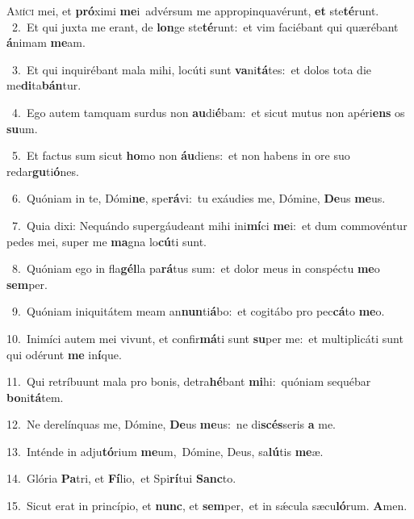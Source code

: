 \lettrine{\initial\textcolor{\initialcolor}{A}}{míci} mei, et \textbf{pró}\-ximi \textbf{me}\-i~\star advérsum me appropinquavérunt, \textbf{et} ste\-\textbf{té}\-runt.\\
{\numbfont\textcolor{\numbcolor}{~2.}}~Et qui juxta me erant, de \textbf{lon}\-ge ste\-\textbf{té}\-runt:~\star et vim faciébant qui quærébant \textbf{á}\-nimam \textbf{me}\-am.\par
{\numbfont\textcolor{\numbcolor}{~3.}}~Et qui inquirébant mala mihi, locúti sunt \textbf{va}\-ni\-\textbf{tá}\-tes:~\star et dolos tota die me\-\textbf{di}\-ta\-\textbf{bán}\-tur.\par
{\numbfont\textcolor{\numbcolor}{~4.}}~Ego autem tamquam surdus non \textbf{au}\-di\-\textbf{é}\-bam:~\star et sicut mutus non apéri\textbf{ens} os \textbf{su}\-um.\par
{\numbfont\textcolor{\numbcolor}{~5.}}~Et factus sum sicut \textbf{ho}\-mo non \textbf{áu}\-diens:~\star et non habens in ore suo redar\-\textbf{gu}\-ti\-\textbf{ó}\-nes.\par
{\numbfont\textcolor{\numbcolor}{~6.}}~Quóniam in te, Dómi\-\textbf{ne}\-, spe\-\textbf{rá}\-vi:~\star tu exáudies me, Dómine, \textbf{De}\-us \textbf{me}\-us.\par
{\numbfont\textcolor{\numbcolor}{~7.}}~Quia dixi: Nequándo supergáudeant mihi ini\-\textbf{mí}\-ci \textbf{me}\-i:~\star et dum commovéntur pedes mei, super me \textbf{ma}\-gna lo\-\textbf{cú}\-ti sunt.\par
{\numbfont\textcolor{\numbcolor}{~8.}}~Quóniam ego in fla\-\textbf{gél}\-la pa\-\textbf{rá}\-tus sum:~\star et dolor meus in conspéctu \textbf{me}\-o \textbf{sem}\-per.\par
{\numbfont\textcolor{\numbcolor}{~9.}}~Quóniam iniquitátem meam an\-\textbf{nun}\-ti\-\textbf{á}\-bo:~\star et cogitábo pro pec\-\textbf{cá}\-to \textbf{me}\-o.\par
{\numbfont\textcolor{\numbcolor}{10.}}~Inimíci autem mei vivunt, et confir\-\textbf{má}\-ti sunt \textbf{su}\-per me:~\star et multiplicáti sunt qui odérunt \textbf{me} in\-\textbf{í}\-que.\par
{\numbfont\textcolor{\numbcolor}{11.}}~Qui retríbuunt mala pro bonis, detra\-\textbf{hé}\-bant \textbf{mi}\-hi:~\star quóniam sequébar \textbf{bo}\-ni\-\textbf{tá}\-tem.\par
{\numbfont\textcolor{\numbcolor}{12.}}~Ne derelínquas me, Dómine, \textbf{De}\-us \textbf{me}\-us:~\star ne di\-\textbf{scés}\-seris \textbf{a} me.\par
{\numbfont\textcolor{\numbcolor}{13.}}~Inténde in adju\-\textbf{tó}\-rium \textbf{me}\-um,~\star Dómine, Deus, sa\-\textbf{lú}\-tis \textbf{me}\-æ.\par
{\numbfont\textcolor{\numbcolor}{14.}}~Glória \textbf{Pa}\-tri, et \textbf{Fí}\-lio,~\star et Spi\-\textbf{rí}\-tui \textbf{Sanc}\-to.\par
{\numbfont\textcolor{\numbcolor}{15.}}~Sicut erat in princípio, et \textbf{nunc}\-, et \textbf{sem}\-per,~\star et in sǽcula sæcu\-\textbf{ló}\-rum. \textbf{A}\-men.\par
